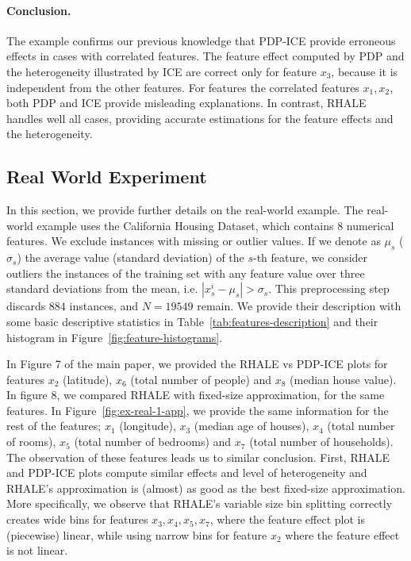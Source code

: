 \documentclass{article} %
\begin{document}
\paragraph{Conclusion.}

The example confirms our previous knowledge that PDP-ICE provide erroneous
effects in cases with correlated features.
The feature effect computed by PDP and the heterogeneity illustrated by
ICE are correct only for feature $x_3$,
because it is independent from the other features.
For features the correlated features $x_1, x_2$,
both PDP and ICE provide misleading explanations.
In contrast, RHALE handles well all cases, providing accurate estimations for the feature effects
and the heterogeneity.

\subsection{Real World Experiment}
\label{sec:real-world-experiment}

In this section, we provide further details on the real-world
example.
The real-world example uses the California Housing Dataset,
which contains 8 numerical features. We exclude instances with missing
or outlier values. If we denote as \(\mu_s\) (\(\sigma_s\)) the
average value (standard deviation) of the \(s\)-th feature, we
consider outliers the instances of the training set with any feature
value over three standard deviations from the mean, i.e.
\(|x_s^i - \mu_s| > \sigma_s\). This preprocessing step discards
\(884\) instances, and \(N=19549\) remain. We provide their
description with some basic descriptive statistics in
Table~\ref{tab:features-description} and their histogram in
Figure~\ref{fig:feature-histograms}.

In Figure 7 of the main paper, we provided the RHALE vs PDP-ICE plots
for features \(x_2\) (latitude), \(x_6\) (total number of people) and
\(x_8\) (median house value). In figure 8, we compared RHALE with
fixed-size approximation, for the same features. In
Figure~\ref{fig:ex-real-1-app}, we provide the same information for the
rest of the features; \(x_1\) (longitude), \(x_3\) (median age of
houses), \(x_4\) (total number of rooms), \(x_5\) (total number of
bedrooms) and \(x_7\) (total number of households). The observation of
these features leads us to similar conclusion. First, RHALE and
PDP-ICE plots compute similar effects and level of heterogeneity and
RHALE's approximation is (almost) as good as the best fixed-size
approximation. More specifically, we observe that RHALE's variable size
bin splitting correctly creates wide bins for features
\(x_3, x_4, x_5, x_7\), where the feature effect plot is (piecewise)
linear, while using narrow bins for feature \(x_2\) where the feature
effect is not linear.
\end{document}
